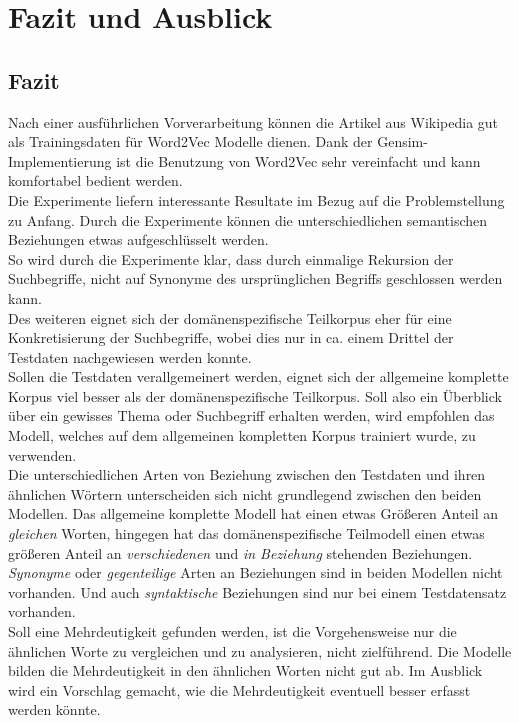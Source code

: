 \documentclass[12pt,a4paper]{report}
\begin{document}
\newpage
\chapter{Fazit und Ausblick}
\section{Fazit}
Nach einer ausführlichen Vorverarbeitung können die Artikel aus Wikipedia gut als Trainingsdaten für Word2Vec Modelle dienen. Dank der Gensim-Implementierung ist die Benutzung von Word2Vec sehr vereinfacht und kann komfortabel bedient werden.\\
Die Experimente liefern interessante Resultate im Bezug auf die Problemstellung zu Anfang. Durch die Experimente können die unterschiedlichen semantischen Beziehungen etwas aufgeschlüsselt werden.\\


So wird durch die Experimente klar, dass durch einmalige Rekursion der Suchbegriffe, nicht auf Synonyme des ursprünglichen Begriffs geschlossen werden kann.\\
Des weiteren eignet sich der domänenspezifische Teilkorpus eher für eine Konkretisierung der Suchbegriffe, wobei dies nur in ca. einem Drittel der Testdaten nachgewiesen werden konnte. \\
Sollen die Testdaten verallgemeinert werden, eignet sich der allgemeine komplette Korpus viel besser als der domänenspezifische Teilkorpus. Soll also ein Überblick über ein gewisses Thema oder Suchbegriff erhalten werden, wird empfohlen das Modell, welches auf dem allgemeinen kompletten Korpus trainiert wurde, zu verwenden.\\
Die unterschiedlichen Arten von Beziehung zwischen den Testdaten und ihren ähnlichen Wörtern unterscheiden sich nicht grundlegend zwischen den beiden Modellen. Das allgemeine komplette Modell hat einen etwas Größeren Anteil an \textit{gleichen} Worten, hingegen hat das domänenspezifische Teilmodell einen etwas größeren Anteil an \textit{verschiedenen} und \textit{in Beziehung} stehenden Beziehungen. \textit{Synonyme} oder \textit{gegenteilige} Arten an Beziehungen sind in beiden Modellen nicht vorhanden. Und auch \textit{syntaktische} Beziehungen sind nur bei einem Testdatensatz vorhanden.\\
Soll eine Mehrdeutigkeit gefunden werden, ist die Vorgehensweise nur die ähnlichen Worte zu vergleichen und zu analysieren, nicht zielführend. Die Modelle bilden die Mehrdeutigkeit in den ähnlichen Worten nicht gut ab. Im Ausblick wird ein Vorschlag gemacht, wie die Mehrdeutigkeit eventuell besser erfasst werden könnte.\\
\end{document}
